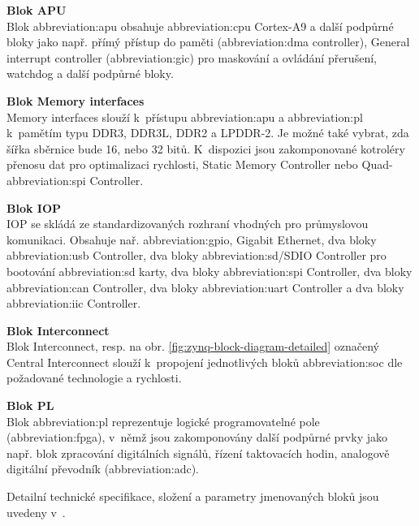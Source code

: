 \documentclass[a4paper, twoside, 11pt]{article}
\begin{document}
			\noindent\textbf{Blok APU}\\
			Blok \gls{abbreviation:apu} obsahuje \gls{abbreviation:cpu} Cortex-A9 a další podpůrné bloky jako např. přímý přístup do paměti (\gls{abbreviation:dma} controller), General interrupt controller (\gls{abbreviation:gic}) pro maskování a ovládání přerušení, watchdog a další podpůrné bloky.\par\vspace*{0.25cm}
			\noindent\textbf{Blok Memory interfaces}\\
			Memory interfaces slouží k~přístupu \gls{abbreviation:apu} a \gls{abbreviation:pl} k~pamětím typu DDR3, DDR3L, DDR2 a LPDDR-2. Je možné také vybrat, zda šířka sběrnice bude 16, nebo 32 bitů. K~dispozici jsou zakomponované kotroléry přenosu dat pro optimalizaci rychlosti, Static Memory Controller nebo Quad-\gls{abbreviation:spi} Controller.\par\vspace*{0.25cm}
			\noindent\textbf{Blok IOP}\\
			IOP se skládá ze standardizovaných rozhraní vhodných pro průmyslovou komunikaci. Obsahuje nař. \gls{abbreviation:gpio}, Gigabit Ethernet, dva bloky \gls{abbreviation:usb} Controller, dva bloky \gls{abbreviation:sd}/SDIO Controller pro bootování \gls{abbreviation:sd} karty, dva bloky \gls{abbreviation:spi} Controller, dva bloky \gls{abbreviation:can} Controller, dva bloky \gls{abbreviation:uart} Controller a dva bloky \gls{abbreviation:iic} Controller.\par\vspace*{0.25cm}
			\noindent\textbf{Blok Interconnect}\\
			Blok Interconnect, resp. na obr. \ref{fig:zynq-block-diagram-detailed} označený Central Interconnect slouží k~propojení jednotlivých bloků \gls{abbreviation:soc} dle požadované technologie a rychlosti.\par\vspace*{0.25cm}
			\noindent\textbf{Blok PL}\\
			Blok \gls{abbreviation:pl} reprezentuje logické programovatelné pole (\gls{abbreviation:fpga}), v~němž jsou zakomponovány další podpůrné prvky jako např. blok zpracování digitálních signálů, řízení taktovacích hodin, analogově digitální převodník (\gls{abbreviation:adc}).\par\vspace*{0.35cm}
			\noindent Detailní technické specifikace, složení a parametry jmenovaných bloků jsou uvedeny v~\cite{xilinx-zynq-7000-technical-reference-manual}.
\end{document}
